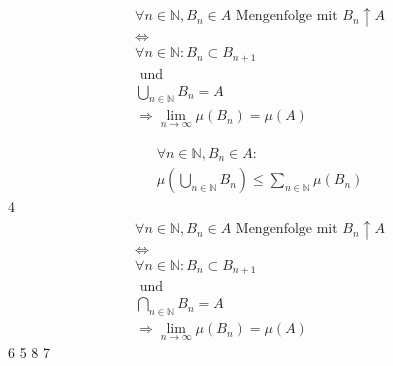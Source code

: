 \documentclass[a4paper]{article}
\begin{document}
{{		%
		{
			{
				\begin{gather*}
					\forall n \in \mathbb{N}, B_n \in A \text{ Mengenfolge mit }
					B_n \uparrow A
					\\ 
					\Leftrightarrow \\
					\forall  n \in \mathbb{N} :
					B_n \subset B_{n+1} 
					\\
					\text{ und }
					\\
					\bigcup_{n \in \mathbb{N} } B_n = A
					\\
					\Rightarrow \lim_{n \to \infty} \mu (B_n) = \mu (A)
				\end{gather*}
			}
			
			\newpage
			{
				\begin{gather*}
					\forall n \in \mathbb{N}, B_n \in A:
					\\
					\mu \left(
						\bigcup_{n \in \mathbb{N} }  B_n
					\right) \leq \sum_{n \in \mathbb{N}} \mu (B_n)
				\end{gather*}
			}
			\newpage
			4
			\newpage
			{
				\begin{gather*}
					\forall n \in \mathbb{N}, B_n \in A \text{ Mengenfolge mit }
					B_n \uparrow A
					\\ 
					\Leftrightarrow \\
					\forall  n \in \mathbb{N} :
					B_n \subset B_{n+1} 
					\\
					\text{ und }
					\\
					\bigcap_{n \in \mathbb{N} } B_n = A
					\\
					\Rightarrow \lim_{n \to \infty} \mu (B_n) = \mu (A)
				\end{gather*}
			}
			\newpage
			6
			\newpage
			5
			\newpage
			8
			\newpage
			7
			\newpage
		}

	}
}
\end{document}
